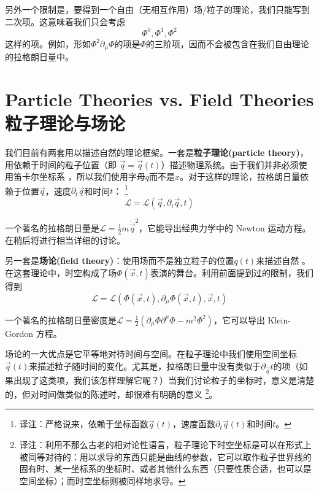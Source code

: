 另外一个限制是，要得到一个自由（无相互作用）场/粒子的理论，我们只能写到二次项。这意味着我们只会考虑%
\[
\Phi^0, \Phi^1, \Phi^2
\]
这样的项。例如，形如\(\Phi^2 \partial_\mu \Phi\)的项是\(\Phi\)的三阶项，因而不会被包含在我们自由理论的拉格朗日量中。

\section[粒子理论与场论]{Particle Theories vs. Field Theories \quad 粒子理论与场论}\label{sec4.3}
我们目前有两套用以描述自然的理论框架。一套是{\bfseries 粒子理论(particle theory)}，用依赖于时间的粒子位置（即 \(\vec{q}=\vec{q}(t)\)）描述物理系统。由于我们并非必须使用笛卡尔坐标系%
%
，所以我们使用字母\(q\)而不是\(x\)。对于这样的理论，拉格朗日量依赖于位置\(\vec{q}\)，速度\(\partial_t\vec{q}\)和时间\(t\)：%
\footnote{译注：严格说来，依赖于坐标函数\(\vec{q}(t)\)，速度函数\(\partial_t\vec{q}(t)\)和时间\(t\)。}
\begin{equation}
\label{equ4.3}
{\mathcal L} = {\mathcal L} (\vec{q},\partial_t\vec{q},t)
\end{equation}

一个著名的拉格朗日量是\({\mathcal L} = \frac{1}{2}m\dot{\vec{q}}^2\)，它能导出经典力学中的 Newton 运动方程。在稍后将进行相当详细的讨论。

另一套是{\bfseries 场论(field theory)}：使用场而不是独立粒子的位置\(q(t)\)来描述自然%
%
。在这套理论中，时空构成了场\(\Phi(\vec{x},t)\)表演的舞台。利用前面提到过的限制，我们得到%
\begin{equation}
\label{equ4.4}
{\mathscr L} = {\mathscr L} (\Phi(\vec{x},t), \partial_\mu \Phi(\vec{x},t), \vec{x}, t)
\end{equation}

一个著名的拉格朗日量密度是\({\mathscr L} = \frac{1}{2}\left(\partial_\mu\Phi\partial^\mu\Phi-m^2\Phi^2\right)\)，它可以导出 Klein-Gordon 方程。

场论的一大优点是它平等地对待时间与空间。在粒子理论中我们使用空间坐标\(\vec{q}(t)\)来描述粒子随时间的变化。尤其是，拉格朗日量中没有类似于\(\partial_{\vec{q}}t\)的项（如果出现了这类项，我们该怎样理解它呢？）当我们讨论粒子的坐标时，意义是清楚的，但对时间做类似的陈述时，却很难有明确的意义%
\footnote{译注：利用不那么古老的相对论性语言，粒子理论下时空坐标是可以在形式上被同等对待的：用以求导的东西只能是曲线的参数，它可以取作粒子世界线的固有时、某一坐标系的坐标时、或者其他什么东西（只要性质合适，也可以是空间坐标）；而时空坐标则被同样地求导。}。

